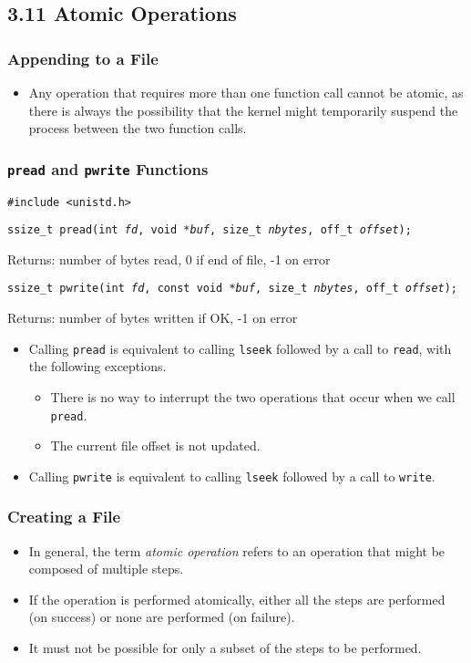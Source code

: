 \documentclass[]{article} \usepackage[all]{xy}
\newcommand{\code}{\texttt}
\begin{document}
\subsection*{3.11 Atomic Operations}
\subsubsection*{Appending to a File}
\begin{itemize}
\item Any operation that requires more than one function call cannot be atomic,
as there is always the possibility that the kernel might temporarily suspend the
process between the two function calls.
\end{itemize}

\subsubsection*{\code{pread} and \code{pwrite} Functions}
\code{\#include <unistd.h>}

\code{ssize\_t pread(int \emph{fd}, void *\emph{buf}, size\_t \emph{nbytes},
off\_t \emph{offset});}

Returns: number of bytes read, 0 if end of file, -1 on error

\code{ssize\_t pwrite(int \emph{fd}, const void *\emph{buf}, size\_t
\emph{nbytes}, off\_t \emph{offset});}

Returns: number of bytes written if OK, -1 on error

\begin{itemize}
\item Calling \code{pread} is equivalent to calling \code{lseek} followed by a
call to \code{read}, with the following exceptions.
\begin{itemize}
\item There is no way to interrupt the two operations that occur when we call
\code{pread}.
\item The current file offset is not updated.
\end{itemize}
\item Calling \code{pwrite} is equivalent to calling \code{lseek} followed by a
call to \code{write}.
\end{itemize}

\subsubsection*{Creating a File}
\begin{itemize}
\item In general, the term \emph{atomic operation} refers to an operation that
might be composed of multiple steps.
\item If the operation is performed atomically, either all the steps are
performed (on success) or none are performed (on failure).
\item It must not be possible for only a subset of the steps to be performed.
\end{itemize}
\end{document}
